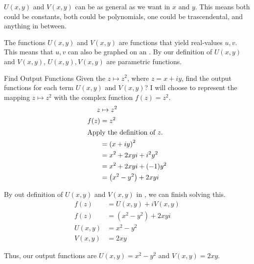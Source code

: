 $U(x, y)$ and $V(x, y)$ can be as general as we want in $x$ and $y$.
This means both could be constants, both could be polynomials, one could be trascendental, and anything in between.

The functions $U(x, y)$ and $V(x, y)$ are functions that yield real-values $u, v$.
This means that $u, v$ can also be graphed on an .
By our definition of $U(x, y)$ and $V(x, y)$, $U(x, y), V(x, y)$ are parametric functions.

\begin{example}[Lecture 4]{Find Output Functions}
  Given the  $z \mapsto z^{2}$, where $z = x + iy$, find the output functions for each term $U(x, y)$ and $V(x, y)$?
  \tcblower{}
  I will choose to represent the mapping $z \mapsto z^{2}$ with the complex function $f(z) = z^{2}$.
  \begin{align*}
    z &\mapsto z^{2} \\
    f(z) &= z^{2} \\
    \shortintertext{Apply the definition of $z$.}
      &= {(x + iy)}^{2} \\
      &= x^{2} + 2xyi + i^{2}y^{2} \\
      &= x^{2} + 2xyi + (-1)y^{2} \\
      &= \left( x^{2} - y^{2} \right) + 2xyi \\
  \end{align*}

  By out definition of $U(x, y)$ and $V(x, y)$ in , we can finish solving this.
  \begin{align*}
    f(z) &= U(x, y) + iV(x, y) \\
    f(z) &= \left( x^{2} - y^{2} \right) + 2xyi \\
    U(x, y) &= x^{2} - y^{2} \\
    V(x, y) &= 2xy
  \end{align*}

  Thus, our output functions are $U(x, y) = x^{2} - y^{2}$ and $V(x, y) = 2xy$.
\end{example}







